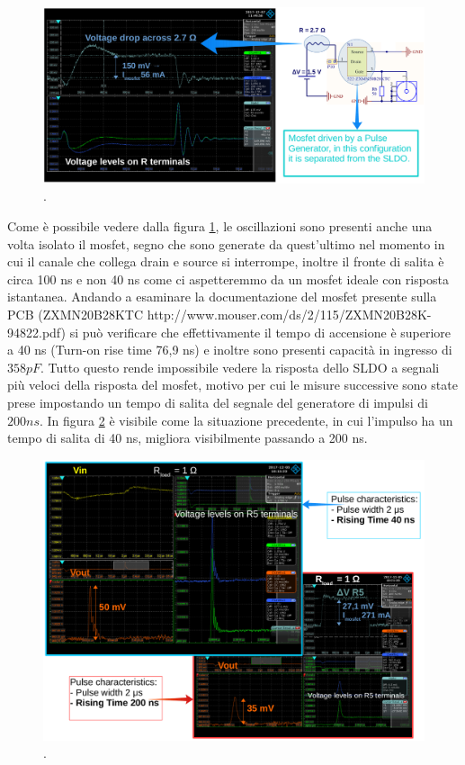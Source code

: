 \begin{figure}
\centering
\includegraphics[scale=.3]{Immagini/MosfetBehaviour}
\caption{.}
\label{MosfetBehaviour}
\end{figure}

Come è possibile vedere dalla figura \ref{MosfetBehaviour}, le oscillazioni sono presenti anche una volta isolato il mosfet, segno che sono generate da quest'ultimo nel momento in cui il canale che collega drain e source si interrompe, inoltre il fronte di salita è circa 100 ns e non 40 ns come ci aspetteremmo da un mosfet ideale con risposta istantanea. Andando a esaminare la documentazione del mosfet presente sulla PCB (ZXMN20B28KTC http://www.mouser.com/ds/2/115/ZXMN20B28K-94822.pdf) si può verificare che effettivamente il tempo di accensione è superiore a 40 ns (Turn-on rise time 76,9 ns) e inoltre sono presenti capacità in ingresso di $358 pF$. Tutto questo rende impossibile vedere la risposta dello SLDO a segnali più veloci della risposta del mosfet, motivo per cui le misure successive sono state prese impostando un tempo di salita del segnale del generatore di impulsi di $200 ns$.
In figura \ref{RiseTime} è visibile come la situazione precedente, in cui l'impulso ha un tempo di salita di 40 ns, migliora visibilmente passando a 200 ns.
\begin{figure}
\centering
\includegraphics[scale=.3]{Immagini/RiseTime}
\caption{.}
\label{RiseTime}
\end{figure}
